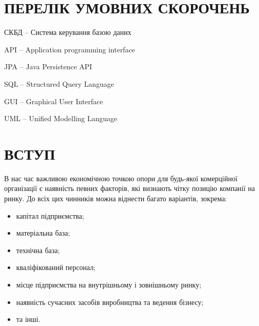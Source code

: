 







\setcounter{page}{6}
\tableofcontents

%

\section*{ПЕРЕЛІК УМОВНИХ СКОРОЧЕНЬ}
\par СКБД -- Система керування базою даних
\par API -- Application programming interface
\par JPA -- Java Persistence API
\par SQL -- Structured Query Language
\par GUI -- Graphical User Interface
\par UML -- Unified Modelling Language


\section*{ВСТУП}
В нас час важливою економічною точкою опори для будь-якої комерційної організації є наявність певних факторів, які визнають чітку позицію компанії на ринку. До всіх цих чинників можна віднести багато варіантів, зокрема:
\begin{itemize}
\item капітал підприємства;
\item матеріальна база;
\item технічна база;
\item кваліфікований персонал;
\item місце підприємства на внутрішньому і зовнішньому ринку;
\item наявність сучасних засобів виробництва та ведення бізнесу;
\item та інші.
\end{itemize}

